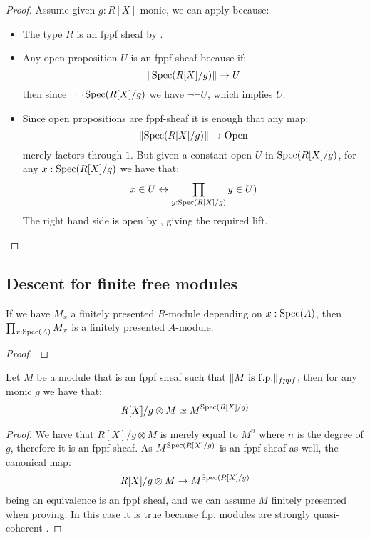 \begin{proof}
Assume given $g:R[X]$ monic, we can apply  because:
\begin{itemize}
\item The type $R$ is an fppf sheaf by .
\item Any open proposition $U$ is an fppf sheaf because if:
\[\lVert \operatorname{Spec}(R[X]/g) \rVert\to U\]
then since $\neg\neg\operatorname{Spec}(R[X]/g)$ we have $\neg\neg U$, which implies $U$.
\item Since open propositions are fppf-sheaf it is enough that any map:
\[\lVert \operatorname{Spec}(R[X]/g) \rVert\to \mathrm{Open}\]
merely factors through $1$. But given a constant open $U$ in $\operatorname{Spec}(R[X]/g)$, for any $x:\operatorname{Spec}(R[X]/g)$ we have that:
\[x\in U \leftrightarrow \prod_{y:\operatorname{Spec}(R[X]/g)} y\in U)\]
The right hand side is open by , giving the required lift. 
\end{itemize}
\end{proof}


\subsection{Descent for finite free modules}

\begin{lemma}\label{fp-equivalent-pointwise}
If we have $M_x$ a finitely presented $R$-module depending on $x:\operatorname{Spec}(A)$, then $\prod_{x:\operatorname{Spec}(A)}M_x$ is a finitely presented $A$-module.
\end{lemma}

\begin{proof}
\cite{TODO}
\end{proof}

\begin{lemma}\label{descent-sqc-fppf}
Let $M$ be a module that is an fppf sheaf such that $\lVert M\ \mathrm{is\ f.p.} \rVert_{fppf}$, then for any monic $g$ we have that:
\[R[X]/g\otimes M \simeq M^{\operatorname{Spec}(R[X]/g)}\]
\end{lemma}

\begin{proof}
We have that $R[X]/g\otimes M$ is merely equal to $M^n$ where $n$ is the degree of $g$, therefore it is an fppf sheaf. As $M^{\operatorname{Spec}(R[X]/g)}$ is an fppf sheaf as well, the canonical map:
\[R[X]/g\otimes M \to M^{\operatorname{Spec}(R[X]/g)}\]
being an equivalence is an fppf sheaf, and we can assume $M$ finitely presented when proving. In this case it is true because f.p. modules are strongly quasi-coherent \cite{TODO}.
\end{proof}

